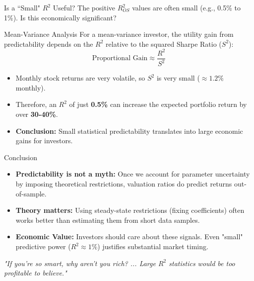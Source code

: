 \documentclass{beamer}
\begin{document}
\begin{frame}{Is a ``Small" $R^2$ Useful?}
    The positive $R^2_{OS}$ values are often small (e.g., 0.5\% to 1\%). Is this economically significant?
    
    \begin{block}{Mean-Variance Analysis}
        For a mean-variance investor, the utility gain from predictability depends on the $R^2$ relative to the squared Sharpe Ratio ($S^2$):
        \begin{equation}
            \text{Proportional Gain} \approx \frac{R^2}{S^2}
        \end{equation}
    \end{block}

    \begin{itemize}
        \item Monthly stock returns are very volatile, so $S^2$ is very small ($\approx 1.2\%$ monthly).
        \item Therefore, an $R^2$ of just \textbf{0.5\%} can increase the expected portfolio return by over \textbf{30-40\%}.
        \item \textbf{Conclusion:} Small statistical predictability translates into large economic gains for investors.
    \end{itemize}
\end{frame}

\begin{frame}{Conclusion}
    \begin{itemize}
        \item \textbf{Predictability is not a myth:} Once we account for parameter uncertainty by imposing theoretical restrictions, valuation ratios do predict returns out-of-sample.
        \item \textbf{Theory matters:} Using steady-state restrictions (fixing coefficients) often works better than estimating them from short data samples.
        \item \textbf{Economic Value:} Investors should care about these signals. Even "small" predictive power ($R^2 \approx 1\%$) justifies substantial market timing.
    \end{itemize}
    
    \vspace{0.5cm}
    \centering
    \textit{"If you're so smart, why aren't you rich? ... Large $R^2$ statistics would be too profitable to believe."}
\end{frame}
\end{document}
